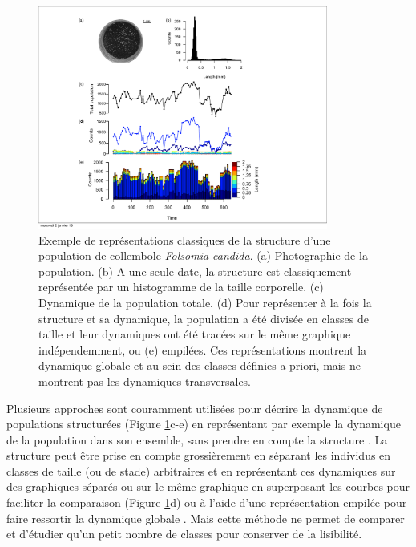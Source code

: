 \begin{figure}[!ht]
\begin{center}
\includegraphics[width=0.85\textwidth]{1_CorpsDeThese/Methodo/STdiag1}
\caption[ Représentation de la
structure d'une population]{Exemple de représentations classiques de la
structure d'une population de collembole \textit{Folsomia candida}. (a)
Photographie de la population. (b) A une seule date, la structure est
classiquement représentée par un histogramme de la taille corporelle. (c)
Dynamique de la population totale. (d) Pour représenter à la fois la structure
et sa dynamique, la population a été divisée en classes de taille et leur
dynamiques ont été tracées sur le même graphique indépendemment, ou (e)
empilées. Ces représentations montrent la dynamique globale et au sein des
classes définies a priori, mais ne montrent pas les dynamiques transversales.}
\label{fig:STd1}
\end{center}
\end{figure}

Plusieurs approches sont couramment utilisées pour décrire la dynamique de
populations structurées (Figure \ref{fig:STd1}c-e) en représentant par exemple
la dynamique de la population dans son ensemble, sans prendre en compte la
structure \autocites[Figure \ref{fig:STd1}c, ][]{schrautzer2011a}. La structure
peut être prise en compte grossièrement en séparant les individus en classes de
taille (ou de stade) arbitraires et en représentant ces dynamiques sur des
graphiques séparés \autocites{plaistow2009a} ou sur le même graphique en superposant les
courbes pour faciliter la comparaison (Figure \ref{fig:STd1}d) ou à l'aide d'une
représentation empilée pour faire ressortir la dynamique globale
\autocites[Figure \ref{fig:STd1}e,][]{madsen2000a}. Mais cette méthode ne permet
de comparer et d'étudier qu'un petit nombre de classes pour conserver de la
lisibilité. 

